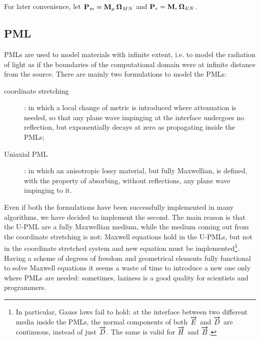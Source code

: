For later convenience, let $\mathbf{P}_m =
{\mathbf{M}_\mu\,\mathbf{\Omega}_{MN}}$ and $\mathbf{P}_e =
{\mathbf{M}_\epsilon\,\mathbf{\Omega}_{EN}}$.

\subsection{PML} \label{sec:pml}

PMLs are used to model materials with infinite extent, i.e. to model
the radiation of light as if the boundaries of the computational
domain were at infinite distance from the source. There are mainly two
formulations to model the PMLs:
\begin{description}
\item[coordinate stretching]: in which a local change of metric is
  introduced where attenuation is needed, so that any plane wave
  impinging at the interface undergoes no reflection, but
  exponentially decays at zero as propagating inside the PMLs;
\item[Uniaxial PML]: in which an anisotropic lossy material, but fully
  Maxwellian, is defined, with the property of absorbing, without
  reflections, any plane wave impinging to it.
\end{description}

Even if both the formulations have been successfully implemented in
many algorithms, we have decided to implement the second. The main
reason is that the U-PML are a fully Maxwellian medium, while the
medium coming out from the coordinate stretching is not: Maxwell
equations hold in the U-PMLs, but not in the coordinate stretched
system and new equation must be implemented\footnote{In particular,
Gauss laws fail to hold: at the interface between two different
media inside the PMLs, the normal components of both $\overrightarrow{E}$ and $\overrightarrow{D}$ are
continuous, instead of just $\overrightarrow{D}$. The same is valid for $\overrightarrow{H}$ and
$\overrightarrow{B}$.}. Having a scheme of degrees of freedom and geometrical elements
fully functional to solve Maxwell equations it seems a waste of time
to introduce a new one only where PMLs are needed: sometimes, laziness
is a good quality for scientists and programmers.

